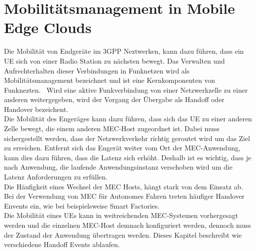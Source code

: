 \documentclass[runningheads]{llncs}
\numberwithin{figure}{section}
\begin{document}
\newpage
\section{Mobilitätsmanagement in Mobile Edge Clouds}
Die Mobilität von Endgeräte im 3GPP Neztwerken, kann dazu führen, dass ein UE sich von einer 
Radio Station zu nächsten bewegt. Das Verwalten und Aufrechterhalten dieser Verbindungen in Funknetzen wird
als Mobilitätsmanagement bezeichnet und ist eine Kernkomponenten von Funknezten. 
Wird eine aktive Funkverbindung von einer Netzwerkzelle zu einer anderen weitergegeben, wird der Vorgang
der Übergabe als Handoff oder Handover bezeichent.\\
Die Mobilität des Engeräges kann dazu führen, 
dass sich das UE zu einer anderen Zelle bewegt, 
die einem anderen MEC-Host zugeordnet ist. Dabei muss sichergestellt werden, dass der Netzwerkverkehr
richtig geroutet wird um das Ziel zu erreichen.
Entfernt sich das Engerät weiter vom Ort der MEC-Anwendung, 
kann dies dazu führen, dass die Latenz sich erhöht. Deshalb ist es wichtig, dass je nach Anwendung,
die laufende Anwendungsinstanz verschoben wird um die Latenz Anforderungen zu erfüllen. \\
Die Häufigkeit eines Wechsel der MEC Hosts, hängt stark von dem 
Einsatz ab. Bei der Verwendung von MEC für Autonomes Fahren treten häufiger Handover Envents ein, wie bei
beispielsweise Smart Factories.\\
Die Mobilität eines UEs kann in weitreichenden MEC-Systemen vorhergesagt werden und die einzelnen MEC-Host demnach konfiguriert werden,
dennoch muss der Zustand der Anwendung übertragen werden.
Dieses Kapitel beschreibt wie verschiedene Handoff Events ablaufen.
\end{document}
